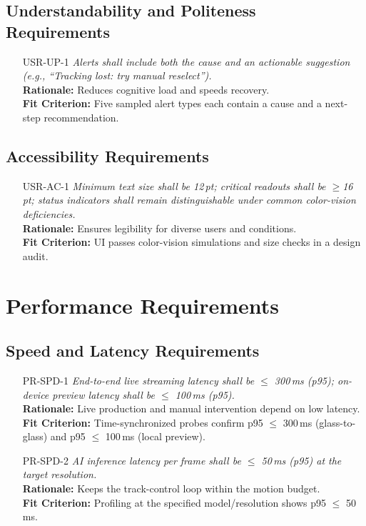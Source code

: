 \documentclass[12pt]{article}
\begin{document}
\subsection{Understandability and Politeness Requirements}
\begin{itemize}[leftmargin=*]
  \item[USR-UP-1] \emph{Alerts shall include both the cause and an actionable suggestion (e.g., “Tracking lost: try manual reselect”).}\\
  \textbf{Rationale:} Reduces cognitive load and speeds recovery.\\
  \textbf{Fit Criterion:} Five sampled alert types each contain a cause and a next-step recommendation.
\end{itemize}

\subsection{Accessibility Requirements}
\begin{itemize}[leftmargin=*]
  \item[USR-AC-1] \emph{Minimum text size shall be 12\,pt; critical readouts shall be $\geq$16\,pt; status indicators shall remain distinguishable under common color-vision deficiencies.}\\
  \textbf{Rationale:} Ensures legibility for diverse users and conditions.\\
  \textbf{Fit Criterion:} UI passes color-vision simulations and size checks in a design audit.
\end{itemize}

\section{Performance Requirements}
\subsection{Speed and Latency Requirements}
\begin{itemize}[leftmargin=*]
  \item[PR-SPD-1] \emph{End-to-end live streaming latency shall be $\leq$ 300\,ms (p95); on-device preview latency shall be $\leq$ 100\,ms (p95).}\\
  \textbf{Rationale:} Live production and manual intervention depend on low latency.\\
  \textbf{Fit Criterion:} Time-synchronized probes confirm p95 $\leq$ 300\,ms (glass-to-glass) and p95 $\leq$ 100\,ms (local preview).

  \item[PR-SPD-2] \emph{AI inference latency per frame shall be $\leq$ 50\,ms (p95) at the target resolution.}\\
  \textbf{Rationale:} Keeps the track-control loop within the motion budget.\\
  \textbf{Fit Criterion:} Profiling at the specified model/resolution shows p95 $\leq$ 50\,ms.
\end{itemize}
\end{document}
